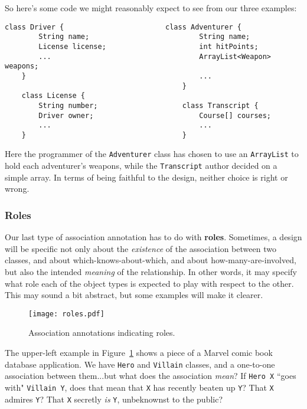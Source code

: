 So here's some code we might reasonably expect to see from our three examples:

\begin{Verbatim}[fontsize=\small,samepage=true,frame=single]
    class Driver {                        class Adventurer {
        String name;                          String name;
        License license;                      int hitPoints;
        ...                                   ArrayList<Weapon> weapons;
    }                                         ...
                                          }
    class License {
        String number;                    class Transcript {
        Driver owner;                         Course[] courses;
        ...                                   ...
    }                                     }
\end{Verbatim}

Here the programmer of the \texttt{Adventurer} class has chosen to use an
\texttt{ArrayList} to hold each adventurer's weapons, while the
\texttt{Transcript} author decided on a simple array. In terms of being
faithful to the design, neither choice is right or wrong.

\subsubsection{Roles}

Our last type of association annotation has to do with \textbf{roles}.
Sometimes, a design will be specific not only about the \textit{existence} of
the association between two classes, and about which-knows-about-which, and
about how-many-are-involved, but also the intended \textit{meaning} of the
relationship. In other words, it may specify what role each of the object
types is expected to play with respect to the other. This may sound a bit
abstract, but some examples will make it clearer.

\begin{figure}[ht]
\centering
\texttt{[image: roles.pdf]}   %
\caption{Association annotations indicating roles.}
\label{fig:roles}
\end{figure}

The upper-left example in Figure~\ref{fig:roles} shows a piece of a Marvel
comic book database application. We have \texttt{Hero} and \texttt{Villain}
classes, and a one-to-one association between them...but what does the
association \textit{mean}? If \texttt{Hero X} ``goes with" \texttt{Villain Y},
does that mean that \texttt{X} has recently beaten up \texttt{Y}? That
\texttt{X} admires \texttt{Y}? That \texttt{X} secretly \textit{is}
\texttt{Y}, unbeknownst to the public?


